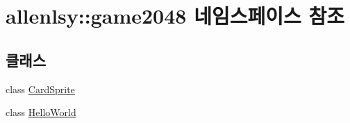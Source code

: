 \hypertarget{namespaceallenlsy_1_1game2048}{}\section{allenlsy\+:\+:game2048 네임스페이스 참조}
\label{namespaceallenlsy_1_1game2048}
\subsection*{클래스}
\begin{DoxyCompactItemize}
\item 
class \hyperlink{classallenlsy_1_1game2048_1_1_card_sprite}{Card\+Sprite}
\item 
class \hyperlink{classallenlsy_1_1game2048_1_1_hello_world}{Hello\+World}
\end{DoxyCompactItemize}
